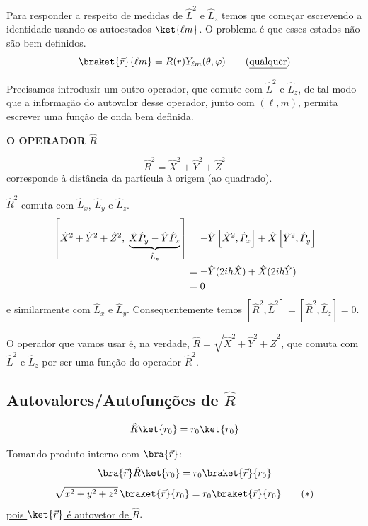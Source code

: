 Para responder a respeito de medidas de $\hat{L}^2$ e $\hat{L}_z$ temos que começar escrevendo a identidade usando os autoestados $\ket{\ell m}$. O problema é que esses estados não são bem definidos.
\begin{equation}
    \braket{\vec{r}}{\ell m} = R(r) Y_{\ell m}(\theta,\varphi) \qquad \text{(\underline{qualquer})}
\label{eq:aula22_problema_lm}
\end{equation}

Precisamos introduzir um outro operador, que comute com $\hat{L}^2$ e $\hat{L}_z$, de tal modo que a informação do autovalor desse operador, junto com $(\ell, m)$, permita escrever uma função de onda bem definida.

\textbf{O OPERADOR $\hat{R}$}

\begin{equation}
    \hat{R}^2 = \hat{X}^2 + \hat{Y}^2 + \hat{Z}^2
\label{eq:aula22_R2_def}
\end{equation}
corresponde à distância da partícula à origem (ao quadrado).

$\hat{R}^2$ comuta com $\hat{L}_x$, $\hat{L}_y$ e $\hat{L}_z$.
\begin{align}
    \left[\hat{X}^2+\hat{Y}^2+\hat{Z}^2, \; \underbrace{\hat{X}\hat{P}_y - \hat{Y}\hat{P}_x}_{\hat{L}_z}\right]
    &= -\hat{Y}\left[\hat{X}^2,\hat{P}_x\right] + \hat{X}\left[\hat{Y}^2,\hat{P}_y\right] \notag \\
    &= -\hat{Y}(2i\hbar\hat{X}) + \hat{X}(2i\hbar\hat{Y}) \notag \\
    &= 0
\label{eq:aula22_R2_Lz_comutador}
\end{align}
e similarmente com $\hat{L}_x$ e $\hat{L}_y$. Consequentemente temos $[\hat{R}^2,\hat{L}^2] = [\hat{R}^2,\hat{L}_z] = 0$.

O operador que vamos usar é, na verdade, $\hat{R} = \sqrt{\hat{X}^2+\hat{Y}^2+\hat{Z}^2}$, que comuta com $\hat{L}^2$ e $\hat{L}_z$ por ser uma função do operador $\hat{R}^2$.

\subsection*{Autovalores/Autofunções de $\hat{R}$}

\begin{equation}
    \hat{R}\ket{r_0} = r_0\ket{r_0}
\label{eq:aula22_R_autovalor}
\end{equation}

Tomando produto interno com $\bra{\vec{r}}$:
\begin{equation}
    \bra{\vec{r}}\hat{R}\ket{r_0} = r_0\braket{\vec{r}}{r_0}
\label{eq:aula22_R_produto_interno}
\end{equation}
\begin{equation}
    \sqrt{x^2+y^2+z^2}\,\braket{\vec{r}}{r_0} = r_0\braket{\vec{r}}{r_0} \qquad (*)
\label{eq:aula22_R_equacao_estrela}
\end{equation}
\underline{pois $\ket{\vec{r}}$ é autovetor de $\hat{R}$}.

